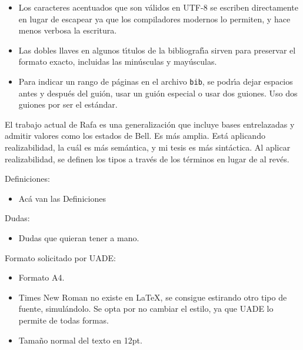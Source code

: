 \begin{itemize}
    \item Los caracteres acentuados que son v\'alidos en UTF-8 se escriben directamente en lugar de escapear ya que los compiladores modernos lo permiten, y hace menos verbosa la escritura.
    \item Las dobles llaves en algunos t\'{\i}tulos de la bibliograf\'{\i}a sirven para preservar el formato exacto, incluidas las min\'usculas y may\'usculas.
    \item Para indicar un rango de p\'aginas en el archivo \texttt{bib}, se podr\'{\i}a dejar espacios antes y despu\'es del gui\'on, usar un gui\'on especial o usar dos guiones. Uso dos guiones por ser el est\'andar.
\end{itemize}

El trabajo actual de Rafa es una generalizaci\'on que incluye bases entrelazadas y admitir valores como los estados de Bell. Es m\'as amplia. Est\'a aplicando realizabilidad, la cu\'al es m\'as sem\'antica, y mi tesis es m\'as sint\'actica. Al aplicar realizabilidad, se definen los tipos a trav\'es de los t\'erminos en lugar de al rev\'es.

Definiciones:
\begin{itemize}
    \item Acá van las Definiciones
\end{itemize}

Dudas:
\begin{itemize}
    \item Dudas que quieran tener a mano.
\end{itemize}

Formato solicitado por UADE:
\begin{itemize}
    \item Formato A4.
    \item Times New Roman no existe en LaTeX, se consigue estirando otro tipo de fuente, simul\'andolo. Se opta por no cambiar el estilo, ya que UADE lo permite de todas formas.
    \item Tama\~no normal del texto en 12pt.
\end{itemize}